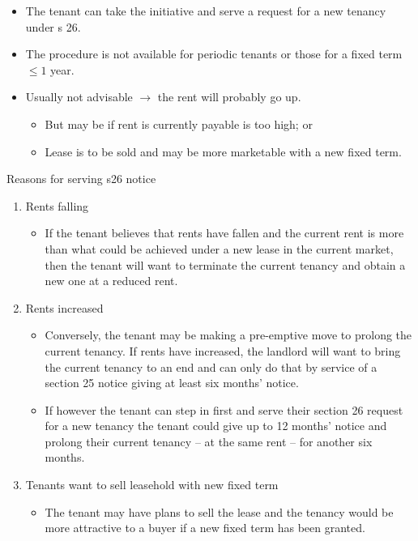 \documentclass[
]{article}
\providecommand{\tightlist}{%
  \setlength{\itemsep}{0pt}\setlength{\parskip}{0pt}}
\newenvironment{env-ab94a4ec-2f9e-4d2f-94d1-74521d1a190e}
{
    \savenotes\tcolorbox[blanker,breakable,left=5pt,borderline west={2pt}{-4pt}{blue}]
}
{
    \endtcolorbox\spewnotes
}
\begin{document}
\begin{itemize}
\tightlist
\item
  The tenant can take the initiative and serve a request for a new
  tenancy under s 26.
\item
  The procedure is not available for periodic tenants or those for a
  fixed term {\(\leq 1\)} year.
\item
  Usually not advisable {\(\rightarrow\)} the rent will probably go up.

  \begin{itemize}
  \tightlist
  \item
    But may be if rent is currently payable is too high; or
  \item
    Lease is to be sold and may be more marketable with a new fixed
    term.
  \end{itemize}
\end{itemize}

\begin{env-ab94a4ec-2f9e-4d2f-94d1-74521d1a190e}

Reasons for serving s26 notice

\begin{enumerate}
\tightlist
\item
  Rents falling

  \begin{itemize}
  \tightlist
  \item
    If the tenant believes that rents have fallen and the current rent
    is more than what could be achieved under a new lease in the current
    market, then the tenant will want to terminate the current tenancy
    and obtain a new one at a reduced rent.
  \end{itemize}
\item
  Rents increased

  \begin{itemize}
  \tightlist
  \item
    Conversely, the tenant may be making a pre-emptive move to prolong
    the current tenancy. If rents have increased, the landlord will want
    to bring the current tenancy to an end and can only do that by
    service of a section 25 notice giving at least six months' notice.
  \item
    If however the tenant can step in first and serve their section 26
    request for a new tenancy the tenant could give up to 12 months'
    notice and prolong their current tenancy -- at the same rent -- for
    another six months.
  \end{itemize}
\item
  Tenants want to sell leasehold with new fixed term

  \begin{itemize}
  \tightlist
  \item
    The tenant may have plans to sell the lease and the tenancy would be
    more attractive to a buyer if a new fixed term has been granted.
  \end{itemize}
\end{enumerate}

\end{env-ab94a4ec-2f9e-4d2f-94d1-74521d1a190e}
\end{document}
